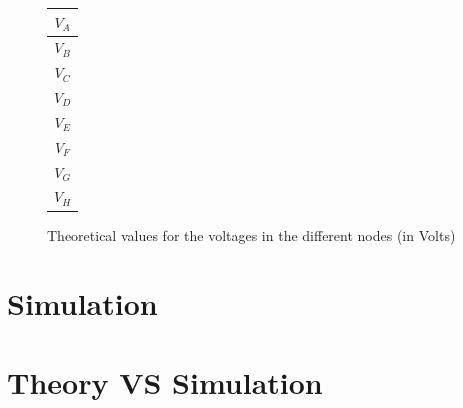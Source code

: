 \documentclass[11pt]{article}
\begin{document}
\vspace{30pt}

\begin{figure}[h]
	\begin{center}
	    \begin{minipage}{.3\textwidth}
		\flushright
		\begin{tabular}{|c|}
		    \hline
		    $V_A$ \\
		    \hline
		    $V_B$ \\
		    \hline
		    $V_C$ \\
		    \hline
		    $V_D$ \\
		    \hline
		    $V_E$ \\
		    \hline
		    $V_F$ \\
		    \hline
		    $V_G$ \\
		    \hline
		    $V_H$ \\
		    \hline
		\end{tabular}
	    \end{minipage}
	    \hspace{-7pt}
	    \begin{minipage}{.3\textwidth}
		\flushleft
		
	    \end{minipage}
	\end{center}
	\caption{Theoretical values for the voltages in the different nodes (in Volts)}
	\label{theory_voltages}
\end{figure}

\pagebreak
\section{Simulation}


\pagebreak
\section{Theory VS Simulation}

\end{document}
